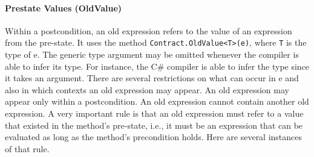 \documentclass{article}
\newcommand{\code}[1]{\lstinline{#1}}
\newcommand{\csharp}{C\#}
\begin{document}
\paragraph{Prestate Values (OldValue)}
Within a postcondition, an old expression refers to the
value of an expression from the pre-state. It uses the method
\code{Contract.OldValue<T>(e)}, where \code{T} is the type of e. The generic
type argument may be omitted whenever the compiler is able to infer
its type. For instance, the \csharp{} compiler is able to infer the type
since it takes an argument. There are several restrictions on what can
occur in e and also in which contexts an old expression may appear. An
old expression may appear only within a postcondition. An old
expression cannot contain another old expression. A very important rule is
that an old expression must refer to a value that existed in the
method's pre-state, i.e., it must be an expression that can be evaluated as long as the method's
precondition holds.
Here are several instances of that rule.  
\end{document}
